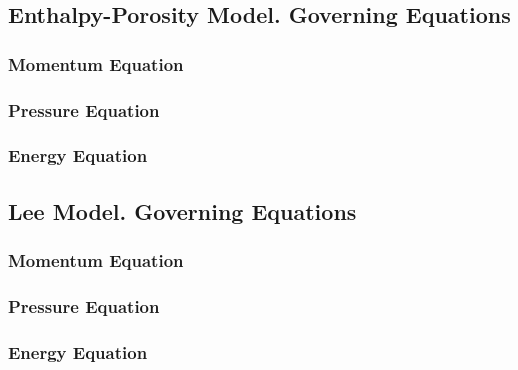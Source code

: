 \subsection{Enthalpy-Porosity Model. Governing Equations}
\subsubsection{Momentum Equation}
\subsubsection{Pressure Equation}
\subsubsection{Energy Equation}
\subsection{Lee Model. Governing Equations}
\subsubsection{Momentum Equation}
\subsubsection{Pressure Equation}
\subsubsection{Energy Equation}




